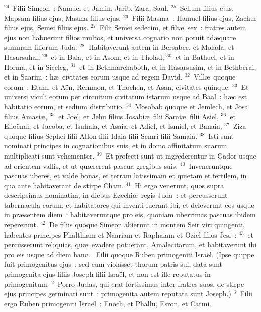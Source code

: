 ${}^{24}$~Filii Simeon~: Namuel et Jamin, Jarib, Zara, Saul.
${}^{25}$~Sellum filius ejus, Mapsam filius ejus, Masma filius ejus.
${}^{26}$~Filii Masma~: Hamuel filius ejus, Zachur filius ejus, Semei filius ejus.
${}^{27}$~Filii Semei sedecim, et fili\ae\ sex~: fratres autem ejus non habuerunt filios multos, et universa cognatio non potuit ad\ae quare summam filiorum Juda.
${}^{28}$~Habitaverunt autem in Bersabee, et Molada, et Hasarsuhal,
${}^{29}$~et in Bala, et in Asom, et in Tholad,
${}^{30}$~et in Bathuel, et in Horma, et in Siceleg,
${}^{31}$~et in Bethmarchaboth, et in Hasarsusim, et in Bethberai, et in Saarim~: h\ae\ civitates eorum usque ad regem David.
${}^{32}$~Vill\ae\ quoque eorum~: Etam, et A\"en, Remmon, et Thochen, et Asan, civitates quinque.
${}^{33}$~Et universi viculi eorum per circuitum civitatum istarum usque ad Baal~: h\ae c est habitatio eorum, et sedium distributio.
${}^{34}$~Mosobab quoque et Jemlech, et Josa filius Amasi\ae ,
${}^{35}$~et Jo\"el, et Jehu filius Josabi\ae\ filii Sarai\ae\ filii Asiel,
${}^{36}$~et Elio\"enai, et Jacoba, et Isuhaia, et Asaia, et Adiel, et Ismiel, et Banaia,
${}^{37}$~Ziza quoque filius Sephei filii Allon filii Idaia filii Semri filii Samaia.
${}^{38}$~Isti sunt nominati principes in cognationibus suis, et in domo affinitatum suarum multiplicati sunt vehementer.
${}^{39}$~Et profecti sunt ut ingrederentur in Gador usque ad orientem vallis, et ut qu\ae rerent pascua gregibus suis.
${}^{40}$~Inveneruntque pascuas uberes, et valde bonas, et terram latissimam et quietam et fertilem, in qua ante habitaverant de stirpe Cham.
${}^{41}$~Hi ergo venerunt, quos supra descripsimus nominatim, in diebus Ezechi\ae\ regis Juda~: et percusserunt tabernacula eorum, et habitatores qui inventi fuerant ibi, et deleverunt eos usque in pr\ae sentem diem~: habitaveruntque pro eis, quoniam uberrimas pascuas ibidem repererunt.
${}^{42}$~De filiis quoque Simeon abierunt in montem Seir viri quingenti, habentes principes Phalthiam et Naariam et Raphaiam et Oziel filios Jesi~:
${}^{43}$~et percusserunt reliquias, qu\ae\ evadere potuerant, Amalecitarum, et habitaverunt ibi pro eis usque ad diem hanc.
~Filii quoque Ruben primogeniti Isra\"el. (Ipse quippe fuit primogenitus ejus~: sed cum violasset thorum patris sui, data sunt primogenita ejus filiis Joseph filii Isra\"el, et non est ille reputatus in primogenitum.
${}^{2}$~Porro Judas, qui erat fortissimus inter fratres suos, de stirpe ejus principes germinati sunt~: primogenita autem reputata sunt Joseph.)
${}^{3}$~Filii ergo Ruben primogeniti Isra\"el~: Enoch, et Phallu, Esron, et Carmi.
